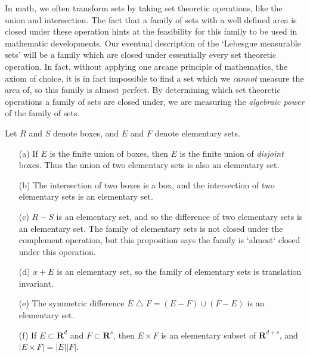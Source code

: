 In math, we often transform sets by taking set theoretic operations, like the union and intersection. The fact that a family of sets with a well defined area is closed under these operation hints at the feasibility for this family to be used in mathematic developments. Our eventual description of the `Lebesgue measurable sets' will be a family which are closed under essentially every set theoretic operation. In fact, without applying one arcane principle of mathematics, the axiom of choice, it is in fact impossible to find a set which we {\it cannot} measure the area of, so this family is almost perfect. By determining which set theoretic operations a family of sets are closed under, we are measuring the {\it algebraic power} of the family of sets.

\begin{theorem}
  Let $R$ and $S$ denote boxes, and $E$ and $F$ denote elementary sets.
  \begin{enumerate}
      \item[(a)] If $E$ is the finite union of boxes, then $E$ is the finite union of {\it disjoint} boxes. Thus the union of two elementary sets is also an elementary set.
      \item[(b)] The intersection of two boxes is a box, and the intersection of two elementary sets is an elementary set.
      \item[(c)] $R-S$ is an elementary set, and so the difference of two elementary sets is an elementary set. The family of elementary sets is not closed under the complement operation, but this proposition says the family is `almost` closed under this operation.
      \item[(d)] $x + E$ is an elementary set, so the family of elementary sets is translation invariant.
      \item[(e)] The symmetric difference $E \bigtriangleup F = (E - F) \cup (F - E)$ is an elementary set.
      \item[(f)] If $E \subset \mathbf{R}^d$ and $F \subset \mathbf{R}^s$, then $E \times F$ is an elementary subset of $\mathbf{R}^{d+s}$, and $|E \times F| = |E||F|$.
  \end{enumerate}
\end{theorem}
